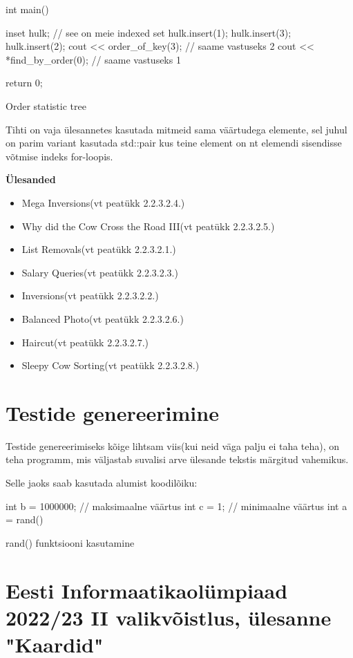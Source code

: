 \documentclass{trkut}
\theoremstyle{definition}
\begin{document}
\begin{appendices}
\begin{cclol}
    int main(){
    inset hulk; // see on meie indexed set
    hulk.insert(1); hulk.insert(3); hulk.insert(2);
    cout << order_of_key(3); // saame vastuseks 2
    cout << *find_by_order(0); // saame vastuseks 1
    
    return 0;
    }
    \end{cclol}
    \begin{kk}[H]
    \caption{Order statistic tree}%
    \end{kk}


    Tihti on vaja ülesannetes kasutada mitmeid sama väärtudega elemente, sel juhul on parim variant kasutada std::pair kus teine element on nt elemendi sisendisse võtmise indeks for-loopis.

\textbf{Ülesanded}
\begin{itemize}
\item Mega Inversions(vt peatükk 2.2.3.2.4.)
\item Why did the Cow Cross the Road III(vt peatükk 2.2.3.2.5.)
\item List Removals(vt peatükk 2.2.3.2.1.)
\item Salary Queries(vt peatükk 2.2.3.2.3.)
\item Inversions(vt peatükk 2.2.3.2.2.)
\item Balanced Photo(vt peatükk 2.2.3.2.6.)
\item Haircut(vt peatükk 2.2.3.2.7.)
\item Sleepy Cow Sorting(vt peatükk 2.2.3.2.8.)
\end{itemize}
 \chapter{Testide genereerimine}\label{lisa14}
    \tiny
    \normalsize

    Testide genereerimiseks kõige lihtsam viis(kui neid väga palju ei taha teha), on teha programm, mis väljastab suvalisi arve ülesande tekstis märgitud vahemikus.

    Selle jaoks saab kasutada alumist koodilõiku:
    \begin{cclol}
    int b = 1000000; // maksimaalne väärtus
    int c = 1;      // minimaalne väärtus
    int a = rand() %
    \end{cclol}
    \begin{kk}[H]
    \caption{rand() funktsiooni kasutamine}%
    \end{kk}

\chapter{Eesti Informaatikaolümpiaad 2022/23 II valikvõistlus, ülesanne "Kaardid"}\label{lisa15}
    \tiny
    \normalsize

\end{appendices}
\end{document}
